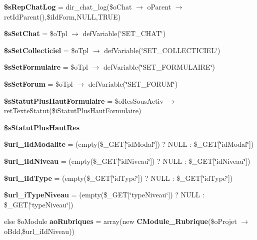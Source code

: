 \begin{CompactItemize}
\item 
\textbf{\$sRepChatLog} = dir\_\-chat\_\-log(\$oChat $\rightarrow$ oParent $\rightarrow$ retIdParent(),\$iIdForm,NULL,TRUE)\label{tableau__bord_8php_338569e06ec0e348d6a898afc48391c8}

\item 
\textbf{\$sSetChat} = \$oTpl $\rightarrow$ defVariable(\char`\"{}SET\_\-CHAT\char`\"{})\label{tableau__bord_8php_fc68f585c8b274920e4f877e34d0918a}

\item 
\textbf{\$sSetCollecticiel} = \$oTpl $\rightarrow$ defVariable(\char`\"{}SET\_\-COLLECTICIEL\char`\"{})\label{tableau__bord_8php_5387bfa4e38b4e58b1ac905534d093ea}

\item 
\textbf{\$sSetFormulaire} = \$oTpl $\rightarrow$ defVariable(\char`\"{}SET\_\-FORMULAIRE\char`\"{})\label{tableau__bord_8php_613343ddc58380bf7a27f1ecff1e92d3}

\item 
\textbf{\$sSetForum} = \$oTpl $\rightarrow$ defVariable(\char`\"{}SET\_\-FORUM\char`\"{})\label{tableau__bord_8php_33ea9edf8df0bab645eb8da717e1f9bb}

\item 
\textbf{\$sStatutPlusHautFormulaire} = \$oResSousActiv $\rightarrow$ retTexteStatut(\$iStatutPlusHautFormulaire)\label{tableau__bord_8php_59220cb41af161ad9df02203e47b4313}

\item 
\textbf{\$sStatutPlusHautRes}
\item 
\textbf{\$url\_\-iIdModalite} = (empty(\$\_\-GET[\char`\"{}idModal\char`\"{}]) ? NULL : \$\_\-GET[\char`\"{}idModal\char`\"{}])\label{tableau__bord_8php_2edc95399ae9c2596483c664df65e666}

\item 
\textbf{\$url\_\-iIdNiveau} = (empty(\$\_\-GET[\char`\"{}idNiveau\char`\"{}]) ? NULL : \$\_\-GET[\char`\"{}idNiveau\char`\"{}])\label{tableau__bord_8php_14f74b59a1171eaf2411d94c3c8bf8dd}

\item 
\textbf{\$url\_\-iIdType} = (empty(\$\_\-GET[\char`\"{}idType\char`\"{}]) ? NULL : \$\_\-GET[\char`\"{}idType\char`\"{}])\label{tableau__bord_8php_7fea7f5b9f2fcee65976df1093b911aa}

\item 
\textbf{\$url\_\-iTypeNiveau} = (empty(\$\_\-GET[\char`\"{}typeNiveau\char`\"{}]) ? NULL : \$\_\-GET[\char`\"{}typeNiveau\char`\"{}])\label{tableau__bord_8php_526ed781c4213d7b78e267d1eeb0b7e4}

\item 
else \$oModule \textbf{aoRubriques} = array(new {\bf CModule\_\-Rubrique}(\$oProjet $\rightarrow$ oBdd,\$url\_\-iIdNiveau))\label{tableau__bord_8php_f4e7de5d5b5866afc15c3990db02567d}

\end{CompactItemize}


